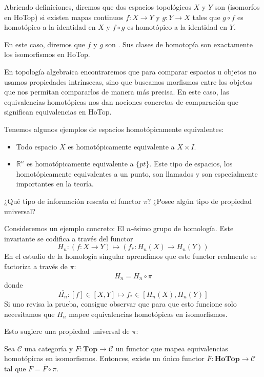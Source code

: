 Abriendo definiciones, diremos que dos espacios topológicos $X$ y $Y$ son  (isomorfos en HoTop) si existen mapas continuos $f\colon X \to Y$ y $g\colon Y \to X$ tales que $g \circ f$ es homotópico a la identidad en $X$ y $f \circ g$ es homotópico a la identidad en $Y$. 

En este caso, diremos que $f$ y $g$ son . Sus clases de homotopía son exactamente los isomorfismos en HoTop.

\begin{nota}
    En topología algebraica encontraremos que para comparar espacios u objetos no usamos propiedades intrínsecas, sino que buscamos morfismos entre los objetos que nos permitan compararlos de manera más precisa. En este caso, las equivalencias homotópicas nos dan nociones concretas de comparación que significan equivalencias en HoTop.
\end{nota}

Tenemos algunos ejemplos de espacios homotópicamente equivalentes:

\begin{itemize}
    \item Todo espacio $X$ es homotópicamente equivalente a $X \times I$.
    \item $\mathbb{R}^n$ es homotópicamente equivalente a $\{pt\}$. Este tipo de espacios, los homotópicamente equivalentes a un punto, son llamados  y son especialmente importantes en la teoría.
\end{itemize}

\begin{pregunta*}
    ¿Qué tipo de información rescata el functor $\pi$? ¿Posee algún tipo de propiedad universal?
\end{pregunta*}

Consideremos un ejemplo concreto: El $n$-ésimo grupo de homología. Este invariante se codifica a través del functor
\[
    H_n: (f\colon X \to Y) \mapsto (f_*: H_n(X) \to H_n(Y))
\]
En el estudio de la homología singular aprendimos que este functor realmente se factoriza a través de $\pi$:
\[
    H_n = \overline{H_n} \circ \pi
\]
donde
\[
    \overline{H_n}: [f] \in [X,Y] \mapsto f_* \in [H_n(X),H_n(Y)]
\]
Si uno revisa la prueba, consigue observar que para que esto funcione solo necesitamos que $H_n$ mapee equivalencias homotópicas en isomorfismos. 

Esto sugiere una propiedad universal de $\pi$:

\begin{proposicion}
    Sea $\mathcal{C}$ una categoría y $F\colon \mathbf{Top} \to \mathcal{C}$ un functor que mapea equivalencias homotópicas en isomorfismos. Entonces, existe un único functor $\overline{F}\colon \mathbf{HoTop} \to \mathcal{C}$ tal que $F = \overline{F} \circ \pi$.
\end{proposicion}

